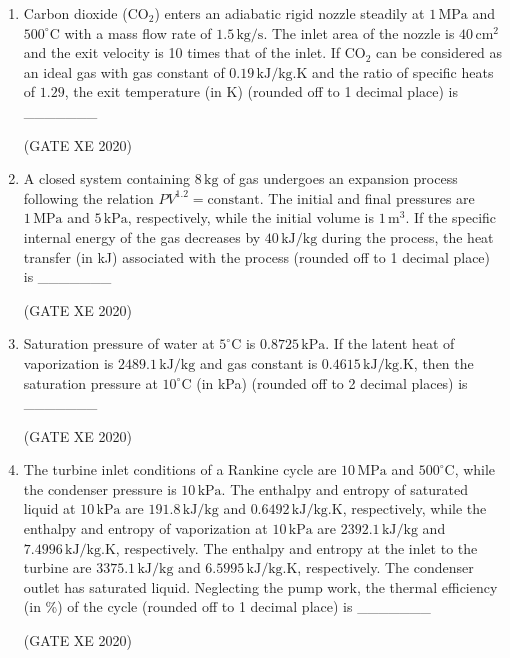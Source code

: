 \documentclass[12pt]{article}
\begin{document}
\begin{enumerate}
(GATE XE 2020)

\item Carbon dioxide (CO$_2$) enters an adiabatic rigid nozzle steadily at $1 \,\text{MPa}$ and $500^\circ \text{C}$ with a mass flow rate of $1.5 \,\text{kg/s}$. 
The inlet area of the nozzle is $40 \,\text{cm}^2$ and the exit velocity is 10 times that of the inlet. 
If CO$_2$ can be considered as an ideal gas with gas constant of $0.19 \,\text{kJ/kg.K}$ and the ratio of specific heats of $1.29$, the exit temperature (in K) (rounded off to 1 decimal place) is 
\_\_\_\_\_\_\_ 

(GATE XE 2020)

\item A closed system containing $8 \,\text{kg}$ of gas undergoes an expansion process following the relation $PV^{1.2} = \text{constant}$. 
The initial and final pressures are $1 \,\text{MPa}$ and $5 \,\text{kPa}$, respectively, while the initial volume is $1 \,\text{m}^3$. 
If the specific internal energy of the gas decreases by $40 \,\text{kJ/kg}$ during the process, the heat transfer (in kJ) associated with the process (rounded off to 1 decimal place) is 
\_\_\_\_\_\_\_ 

(GATE XE 2020)

\item Saturation pressure of water at $5^\circ \text{C}$ is $0.8725 \,\text{kPa}$. 
If the latent heat of vaporization is $2489.1 \,\text{kJ/kg}$ and gas constant is $0.4615 \,\text{kJ/kg.K}$, then the saturation pressure at $10^\circ \text{C}$ (in kPa) (rounded off to 2 decimal places) is 
\_\_\_\_\_\_\_ 

(GATE XE 2020)

\item The turbine inlet conditions of a Rankine cycle are $10 \,\text{MPa}$ and $500^\circ \text{C}$, while the condenser pressure is $10 \,\text{kPa}$. 
The enthalpy and entropy of saturated liquid at $10 \,\text{kPa}$ are $191.8 \,\text{kJ/kg}$ and $0.6492 \,\text{kJ/kg.K}$, respectively, while the enthalpy and entropy of vaporization at $10 \,\text{kPa}$ are $2392.1 \,\text{kJ/kg}$ and $7.4996 \,\text{kJ/kg.K}$, respectively. 
The enthalpy and entropy at the inlet to the turbine are $3375.1 \,\text{kJ/kg}$ and $6.5995 \,\text{kJ/kg.K}$, respectively. 
The condenser outlet has saturated liquid. Neglecting the pump work, the thermal efficiency (in \%) of the cycle (rounded off to 1 decimal place) is 
\_\_\_\_\_\_\_ 

(GATE XE 2020)


\end{enumerate}
\end{document}
